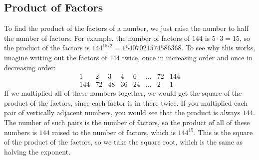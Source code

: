 \documentclass{article}
\begin{document}
\begin{multicols}{2}
	\subsection*{Product of Factors}
	To find the product of the factors of a number, we just raise the number to half the
	number of factors.
	For example, the number of factors of $144$ is $5 \cdot 3 = 15$, so the product of the factors
	is $144^{15 / 2} = 15407021574586368$.
	To see why this works, imagine writing out the factors of $144$ twice,
	once in increasing order and once in decreasing order:
	\[
		\begin{array}{cccccccc}
			1   & 2  & 3  & 4  & 6  & \dots & 72 & 144 \\
			144 & 72 & 48 & 36 & 24 & \dots & 2  & 1
		\end{array}
	\]
	If we multiplied all of these numbers together, we would get the square of the
	product of the factors, since each factor is in there twice.
	If you multiplied each pair of vertically adjacent numbers, you would see that the product
	is always $144$.
	The number of such pairs is the number of factors, so the product of all of these numbers
	is $144$ raised to the number of factors, which is $144^{15}$.
	This is the square of the product of the factors, so we take the square root,
	which is the same as halving the exponent.
\end{multicols}
\end{document}
